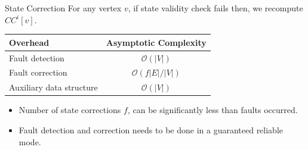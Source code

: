 \pause 

\begin{alertblock}{State Correction}
For any vertex $v$, if state validity check fails then, we recompute  $CC^{i}[v]$.
\end{alertblock}
\lyxframeend{}

\begin{center}
\begin{tabular}{l|c}
\toprule 
      Overhead           & Asymptotic Complexity     \\
\midrule                  
Fault detection        & $\mathcal{O}(|V|)$      \\
Fault correction       & $\mathcal{O}(f|E|/|V|)$ \\
Auxiliary data structure     & $\mathcal{O}(|V|)$      \\
\bottomrule 
\end{tabular}
\end{center}
\begin{itemize}
\item Number of state corrections $f$, can be significantly less than faults occurred.
\item Fault detection and correction needs to be done in a guaranteed reliable mode.
\end{itemize}

\lyxframeend{}